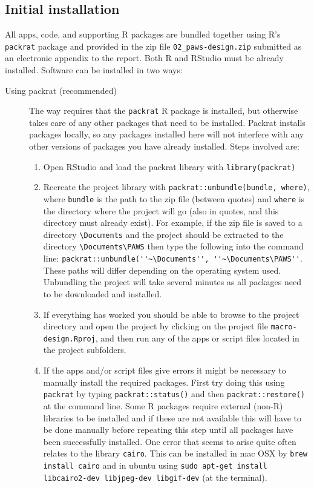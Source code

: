 \documentclass[a4paper,11pt]{article} %
\begin{document}
\subsection{Initial installation}

All apps, code, and supporting R packages are bundled together using R's \texttt{packrat} package and provided in the zip file \verb!02_paws-design.zip! submitted as an electronic appendix to the report. Both R and RStudio must be already installed. Software can be installed in two ways:
\begin{description}
\item[Using packrat (recommended)] The way requires that the \texttt{packrat} R package is installed, but otherwise takes care of any other packages that need to be installed. Packrat installs packages locally, so any packages installed here will not interfere with any other versions of packages you have already installed. Steps involved are:
\begin{enumerate}
\item Open RStudio and load the packrat library with \verb!library(packrat)!
\item Recreate the project library with \verb!packrat::unbundle(bundle, where)!, where \texttt{bundle} is the path to the zip file (between quotes) and \texttt{where} is the directory where the project will go (also in quotes, and this directory must already exist). For example, if the zip file is saved to a directory \verb!\Documents! and the project should be extracted to the directory \verb!\Documents\PAWS! then type the following into the command line: \verb!packrat::unbundle(''~\Documents'', ''~\Documents\PAWS''!. These paths will differ depending on the operating system used. Unbundling the project will take several minutes as all packages need to be downloaded and installed.  
\item If everything has worked you should be able to browse to the project directory and open the project by clicking on the project file \texttt{macro-design.Rproj}, and then run any of the apps or script files located in the project subfolders. 
\item If the apps and/or script files give errors it might be necessary to manually install the required packages. First try doing this using \texttt{packrat} by typing \verb!packrat::status()! and then \verb!packrat::restore()! at the command line. Some R packages require external (non-R) libraries to be installed and if these are not available this will have to be done manually before repeating this step until all packages have been successfully installed. One error that seems to arise quite often relates to the library \verb!cairo!. This can be installed in mac OSX by \verb!brew install cairo! and in ubuntu using \verb!sudo apt-get install libcairo2-dev libjpeg-dev libgif-dev! (at the terminal).

\end{enumerate}
\end{description}
\end{document}
